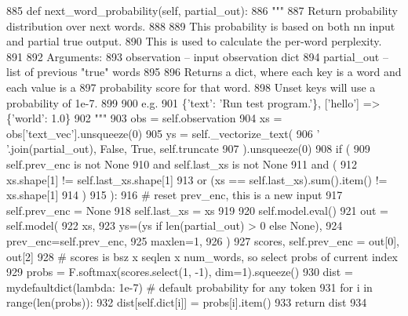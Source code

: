 \begin{DoxyCode}
885     \textcolor{keyword}{def }next\_word\_probability(self, partial\_out):
886         \textcolor{stringliteral}{"""}
887 \textcolor{stringliteral}{        Return probability distribution over next words.}
888 \textcolor{stringliteral}{}
889 \textcolor{stringliteral}{        This probability is based on both nn input and partial true output.}
890 \textcolor{stringliteral}{        This is used to calculate the per-word perplexity.}
891 \textcolor{stringliteral}{}
892 \textcolor{stringliteral}{        Arguments:}
893 \textcolor{stringliteral}{        observation -- input observation dict}
894 \textcolor{stringliteral}{        partial\_out -- list of previous "true" words}
895 \textcolor{stringliteral}{}
896 \textcolor{stringliteral}{        Returns a dict, where each key is a word and each value is a}
897 \textcolor{stringliteral}{        probability score for that word.}
898 \textcolor{stringliteral}{        Unset keys will use a probability of 1e-7.}
899 \textcolor{stringliteral}{}
900 \textcolor{stringliteral}{        e.g.}
901 \textcolor{stringliteral}{        \{'text': 'Run test program.'\}, ['hello'] => \{'world': 1.0\}}
902 \textcolor{stringliteral}{        """}
903         obs = self.observation
904         xs = obs[\textcolor{stringliteral}{'text\_vec'}].unsqueeze(0)
905         ys = self.\_vectorize\_text(
906             \textcolor{stringliteral}{' '}.join(partial\_out), \textcolor{keyword}{False}, \textcolor{keyword}{True}, self.truncate
907         ).unsqueeze(0)
908         \textcolor{keywordflow}{if} (
909             self.prev\_enc \textcolor{keywordflow}{is} \textcolor{keywordflow}{not} \textcolor{keywordtype}{None}
910             \textcolor{keywordflow}{and} self.last\_xs \textcolor{keywordflow}{is} \textcolor{keywordflow}{not} \textcolor{keywordtype}{None}
911             \textcolor{keywordflow}{and} (
912                 xs.shape[1] != self.last\_xs.shape[1]
913                 \textcolor{keywordflow}{or} (xs == self.last\_xs).sum().item() != xs.shape[1]
914             )
915         ):
916             \textcolor{comment}{# reset prev\_enc, this is a new input}
917             self.prev\_enc = \textcolor{keywordtype}{None}
918         self.last\_xs = xs
919 
920         self.model.eval()
921         out = self.model(
922             xs,
923             ys=(ys \textcolor{keywordflow}{if} len(partial\_out) > 0 \textcolor{keywordflow}{else} \textcolor{keywordtype}{None}),
924             prev\_enc=self.prev\_enc,
925             maxlen=1,
926         )
927         scores, self.prev\_enc = out[0], out[2]
928         \textcolor{comment}{# scores is bsz x seqlen x num\_words, so select probs of current index}
929         probs = F.softmax(scores.select(1, -1), dim=1).squeeze()
930         dist = mydefaultdict(\textcolor{keyword}{lambda}: 1e-7)  \textcolor{comment}{# default probability for any token}
931         \textcolor{keywordflow}{for} i \textcolor{keywordflow}{in} range(len(probs)):
932             dist[self.dict[i]] = probs[i].item()
933         \textcolor{keywordflow}{return} dist
934 \end{DoxyCode}


